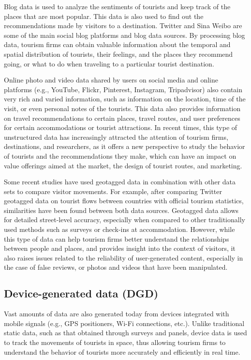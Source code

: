 \documentclass[
  letterpaper,
  DIV=11,
  numbers=noendperiod]{scrreprt}
\begin{document}
Blog data is used to analyze the sentiments of tourists and keep track
of the places that are most popular. This data is also used to find out
the recommendations made by visitors to a destination. Twitter and Sina
Weibo are some of the main social blog platforms and blog data sources.
By processing blog data, tourism firms can obtain valuable information
about the temporal and spatial distribution of tourists, their feelings,
and the places they recommend going, or what to do when traveling to a
particular tourist destination.

Online photo and video data shared by users on social media and online
platforms (e.g., YouTube, Flickr, Pinterest, Instagram, Tripadvisor)
also contain very rich and varied information, such as information on
the location, time of the visit, or even personal notes of the tourists.
This data also provides information on travel recommendations to certain
places, travel routes, and user preferences for certain accommodations
or tourist attractions. In recent times, this type of unstructured data
has increasingly attracted the attention of tourism firms, destinations,
and researchers, as it offers a new perspective to study the behavior of
tourists and the recommendations they make, which can have an impact on
value offerings aimed at the market, the design of tourist routes, and
marketing.

Some recent studies have used geotagged data in combination with other
data sets to compare visitor movements. For example, after comparing
Twitter geotagged data on tourist flows between countries with official
tourism statistics, similarities have been found between both data
sources. Geotagged data allows for detailed street-level accuracy,
especially when compared to other traditionally used methods such as
surveys or check-ins at accommodation. However, while this type of data
can help tourism firms better understand the relationships between
people and places, and provides insight into the context of visitors, it
also raises issues related to the reliability of user-generated content,
especially in the case of false reviews, or photos and videos that have
been manipulated.

\hypertarget{device-generated-data-dgd}{%
\subsection{Device-generated data
(DGD)}\label{device-generated-data-dgd}}

Vast amounts of data are also generated today from devices integrated
with mobile signals (e.g., GPS positioners, Wi-Fi connections, etc.).
Unlike traditional static data, such as that obtained through surveys
and panels, device data is used to track the movements of tourists in
space, thus allowing tourism firms to understand the behavior of
tourists more accurately and efficiently in real time.
\end{document}
